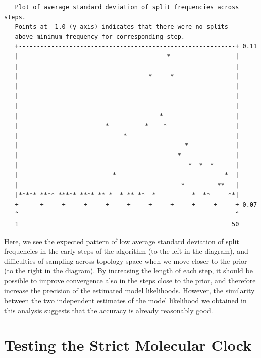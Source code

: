 \documentclass[12pt]{book}
\begin{document}
\small
\begin{singlespacing}
\begin{verbatim}
   Plot of average standard deviation of split frequencies across steps.
   Points at -1.0 (y-axis) indicates that there were no splits
   above minimum frequency for corresponding step.
   +------------------------------------------------------------+ 0.11
   |                                         *                  |
   |                                                            |
   |                                    *     *                 |
   |                                                            |
   |                                                            |
   |                                                            |
   |                                       *                    |
   |                        *          *    *                   |
   |                             *                              |
   |                                              *             |
   |                                            *               |
   |                                               *  *  *      |
   |                          *                              *  |
   |                                             *         **   |
   |***** **** ***** **** ** *  * ** **  *          *  **     **|
   +------+-----+-----+-----+-----+-----+-----+-----+-----+-----+ 0.07
   ^                                                            ^
   1                                                           50
\end{verbatim}
\end{singlespacing}
\normalsize

Here, we see the expected pattern of low average standard deviation of split frequencies in the
early steps of the algorithm (to the left in the diagram), and difficulties of sampling across
topology space when we move closer to the prior (to the right in the diagram). By increasing the
length of each step, it should be possible to improve convergence also in the steps close to the
prior, and therefore increase the precision of the estimated model likelihoods. However, the
similarity between the two independent estimates of the model likelihood we obtained in this
analysis suggests that the accuracy is already reasonably good.


\section{Testing the Strict Molecular Clock}
\label{strictClock}
\end{document}
